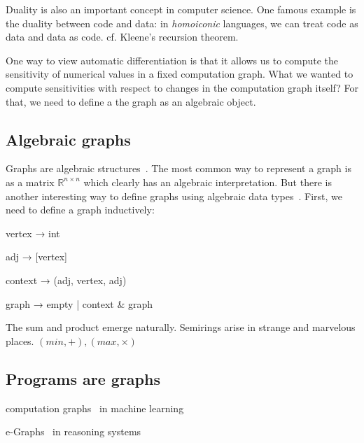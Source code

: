 \documentclass[11pt]{article}
\begin{document}
    Duality is also an important concept in computer science. One famous example is the duality between code and data: in \textit{homoiconic} languages, we can treat code as data and data as code. cf. Kleene's recursion theorem.

    One way to view automatic differentiation is that it allows us to compute the sensitivity of numerical values in a fixed computation graph. What we wanted to compute sensitivities with respect to changes in the computation graph itself? For that, we need to define a the graph as an algebraic object.

    \subsection{Algebraic graphs}\label{subsec:algebraic-graphs}

    Graphs are algebraic structures~\cite{weisfeiler1968reduction}. The most common way to represent a graph is as a matrix $\mathbb{R}^{n\times n}$ which clearly has an algebraic interpretation. But there is another interesting way to define graphs using algebraic data types~\cite{mokhov2017algebraic}. First, we need to define a graph inductively:

    vertex  → int

    adj     → [vertex]

    context → (adj, vertex, adj)

    graph   → empty | context & graph

    \noindent The sum and product emerge naturally. Semirings arise in strange and marvelous places. $(min, +), (max, \times)$


    \subsection{Programs are graphs}\label{sec:program-graphs}

    computation graphs~\citep{breuleux2017automatic} in machine learning

    e-Graphs~\citep{willsey2020egg} in reasoning systems
\end{document}

